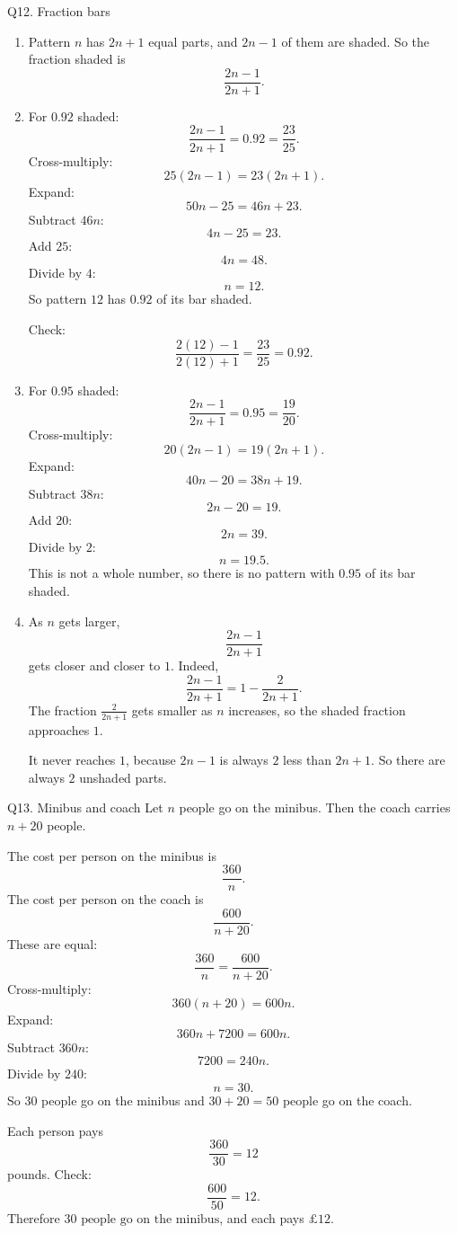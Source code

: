 \documentclass[11pt,a4paper]{article}
\begin{document}
\begin{solbox}{Q12. Fraction bars}
\begin{enumerate}[label=(\alph*)]
\item Pattern \(n\) has \(2n+1\) equal parts, and \(2n-1\) of them are shaded. So the fraction shaded is
\[
\boxed{\frac{2n-1}{2n+1}}.
\]

\item For \(0.92\) shaded:
\[
\frac{2n-1}{2n+1}=0.92=\frac{23}{25}.
\]
Cross-multiply:
\[
25(2n-1)=23(2n+1).
\]
Expand:
\[
50n-25=46n+23.
\]
Subtract \(46n\):
\[
4n-25=23.
\]
Add \(25\):
\[
4n=48.
\]
Divide by \(4\):
\[
n=12.
\]
So pattern \(\boxed{12}\) has \(0.92\) of its bar shaded.

Check:
\[
\frac{2(12)-1}{2(12)+1}=\frac{23}{25}=0.92.
\]

\item For \(0.95\) shaded:
\[
\frac{2n-1}{2n+1}=0.95=\frac{19}{20}.
\]
Cross-multiply:
\[
20(2n-1)=19(2n+1).
\]
Expand:
\[
40n-20=38n+19.
\]
Subtract \(38n\):
\[
2n-20=19.
\]
Add \(20\):
\[
2n=39.
\]
Divide by \(2\):
\[
n=19.5.
\]
This is not a whole number, so there is no pattern with \(0.95\) of its bar shaded.

\item As \(n\) gets larger,
\[
\frac{2n-1}{2n+1}
\]
gets closer and closer to \(1\). Indeed,
\[
\frac{2n-1}{2n+1}=1-\frac{2}{2n+1}.
\]
The fraction \(\frac{2}{2n+1}\) gets smaller as \(n\) increases, so the shaded fraction approaches \(1\).

It never reaches \(1\), because \(2n-1\) is always \(2\) less than \(2n+1\). So there are always \(2\) unshaded parts.
\end{enumerate}
\end{solbox}

\begin{solbox}{Q13. Minibus and coach}
Let \(n\) people go on the minibus. Then the coach carries \(n+20\) people.

The cost per person on the minibus is
\[
\frac{360}{n}.
\]
The cost per person on the coach is
\[
\frac{600}{n+20}.
\]
These are equal:
\[
\frac{360}{n}=\frac{600}{n+20}.
\]
Cross-multiply:
\[
360(n+20)=600n.
\]
Expand:
\[
360n+7200=600n.
\]
Subtract \(360n\):
\[
7200=240n.
\]
Divide by \(240\):
\[
n=30.
\]
So \(30\) people go on the minibus and \(30+20=50\) people go on the coach.

Each person pays
\[
\frac{360}{30}=12
\]
pounds. Check:
\[
\frac{600}{50}=12.
\]
Therefore \(\boxed{30\text{ people go on the minibus}}\), and each pays \(\boxed{\pounds12}\).
\end{solbox}
\end{document}
